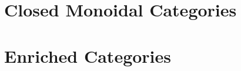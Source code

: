 \documentclass[11pt,notitlepage,a4paper]{report}
\begin{document}
\chapter{Closed Monoidal Categories}
\label{closed_monoidal_categories_chapter}

  
  

\chapter{Enriched Categories}
\label{enriched_categories_chapter}

  

\clearpage
{}
{}



\end{document}

